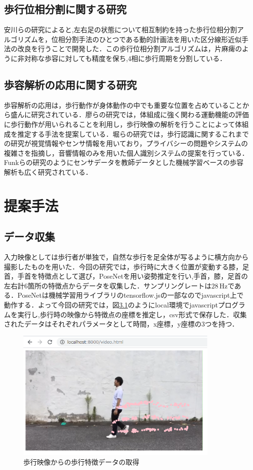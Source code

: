 \documentclass[a4j,10.5pt]{jreport}
\begin{document}
\section{歩行位相分割に関する研究}
安川らの研究\cite{yasukawa}によると,左右足の状態について相互制約を持った歩行位相分割アルゴリズムを，位相分割手法のひとつである動的計画法を用いた区分線形近似手法の改良を行うことで開発した．この歩行位相分割アルゴリズムは，片麻痺のように非対称な歩容に対しても精度を保ち,4相に歩行周期を分割している．
\section{歩容解析の応用に関する研究}
歩容解析の応用は，歩行動作が身体動作の中でも重要な位置を占めていることから盛んに研究されている．廖ら\cite{cite1}の研究では，体組成に強く関わる運動機能の評価に歩行動作が用いられることを利用し，歩行映像の解析を行うことによって体組成を推定する手法を提案している．堀ら\cite{hori}の研究では，歩行認識に関するこれまでの研究が視覚情報やセンサ情報を用いており，プライバシーの問題やシステムの複雑さを指摘し，音響情報のみを用いた個人識別システムの提案を行っている．Funkら\cite{funk}の研究のようにセンサデータを教師データとした機械学習ベースの歩容解析も広く研究されている．


\chapter{提案手法}
\section{データ収集}
入力映像としては歩行者が単独で，自然な歩行を足全体が写るように横方向から撮影したものを用いた．今回の研究では，歩行時に大きく位置が変動する膝，足首，手首を特徴点として選び，PoseNetを用い姿勢推定を行い,手首，膝，足首の左右計6箇所の特徴点からデータを収集した．サンプリングレートは$28\,\mathrm{Hz}$である．PoseNetは機械学習用ライブラリのtensorflow.jsの一部なのでjavascript上で動作する．よって今回の研究では，図\ref{fig:datecollect}のようにlocal環境でjavascriptプログラムを実行し,歩行時の映像から特徴点の座標を推定し，csv形式で保存した．収集されたデータはそれぞれパラメータとして時間，x座標，y座標の3つを持つ．
\begin{figure}[H]
  \centering
  \includegraphics[width=10cm]{figs/datacollect1.png}
  \caption{歩行映像からの歩行特徴データの取得}\label{fig:datecollect}
\end{figure}
\end{document}
